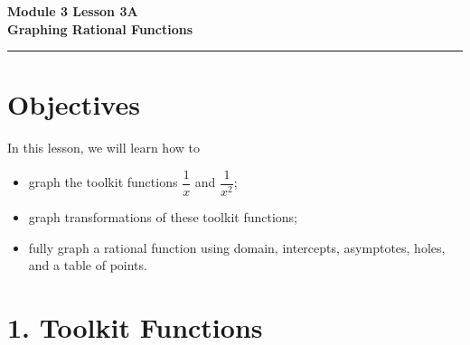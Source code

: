 \documentclass[12pt]{article}
\begin{document}
\handwriting

\begin{center}
    \Large\textbf{\color{primaryblue}Module 3 Lesson 3A\\Graphing Rational Functions} \\
    \vspace{0.2cm}
    \hrule
\end{center}

\section*{Objectives}

\begin{friendlyrule}{In this lesson, we will learn how to}
\begin{itemize}
    \item graph the toolkit functions $\dfrac{1}{x}$ and $\dfrac{1}{x^2}$;
    \item graph transformations of these toolkit functions;
    \item fully graph a rational function using domain, intercepts, asymptotes, holes, and a table of points.
\end{itemize}
\end{friendlyrule}

\section*{1. Toolkit Functions}
\end{document}
